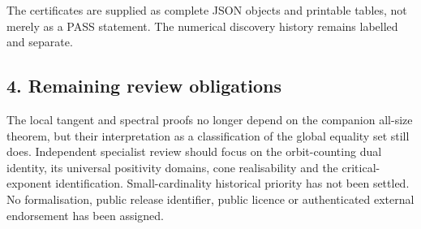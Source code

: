 \documentclass[11pt,a4paper]{article}
\begin{document}
The certificates are supplied as complete JSON objects and printable
tables, not merely as a PASS statement. The numerical discovery history
remains labelled and separate.

\subsection{4. Remaining review
obligations}\label{remaining-review-obligations}

The local tangent and spectral proofs no longer depend on the companion
all-size theorem, but their interpretation as a classification of the
global equality set still does. Independent specialist review should
focus on the orbit-counting dual identity, its universal positivity
domains, cone realisability and the critical-exponent identification.
Small-cardinality historical priority has not been settled. No
formalisation, public release identifier, public licence or
authenticated external endorsement has been assigned.
\end{document}
